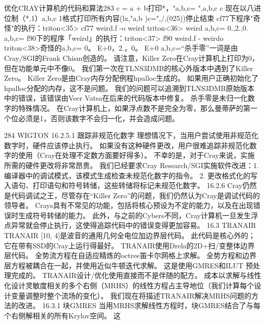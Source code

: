 \documentclass[UTF8,11pt,a4paper,openany,fontset=fandol]{ctexbook}
\begin{document}
优化CRAY计算机的代码和算法283 c = a + b打印*，"a,b,c= ",a,b,c c 现在以八进位制（*,1）a,b,c 1格式打印所有内容(lx,"a,b )c=",/,(025))停止结束 cf77下程序"奇怪"的执行：triton<35> cf77 weird.f -o weird triton<36> weird a,b,c= 0.,2.,0. a,b,c= f90下的程序「weird」的执行：triton<37> f90 weird.f - weirdo triton<38>奇怪的a,b,c= 0。 E+0，2.，0。 E+0 a,b,c=“杀手零”一词是由Cray/SGI的Frank Chism创造的。 请注意，Killer Zero在Cray计算机上打印为0，但在功能单元中不像0。 我们第一次在TLNS3DMB的核心外版本中遇到了Killer Zero。 Killer Zero是由Cray内存分配例程hpalloc生成的。 如果用户正确初始化了hpalloc分配的内存，这不是问题。 我们的问题可以追溯到TLNS3DMB原始版本中的错误，该错误由Veer Vatsa在后来的代码版本中修复。 杀手零是未归一化数字的特殊情况。 在Cray计算机上，如果浮点数不是完全为零，那么曼蒂萨的第一个位必须是1，否则该数字不会归一化，并会造成问题。

284 WIGTON 16.2.5.1 跟踪非规范化数字 理想情况下，当用户尝试使用非规范化数字时，硬件应该停止执行。 如果没有这种硬件更改，用户很难追踪非规范化数字的使用（Cray在处理不定数方面要好得多）。 不幸的是，对于Cray来说，实施所需的硬件更改将非常昂贵。 我们已经要求Cray Research/SGI实施软件改进：1. 编译器中的调试模式，该模式生成检查未规范化数字的指令。 2. 更改格式化的写入语句、打印语句和符号转储，这些转储将标记未规范化数字。 16.2.6 Cray仍然是代码调试之王，尽管存在“Killer Zero”的问题，我们仍然认为Cray是调试代码的领导者。 Crays具有不常见的功能，包括将核心预设为不定的能力，以及在出现错误时生成符号转储的能力。 此外，与之前的Cybers不同，Cray计算机一旦发生浮点异常就会停止执行，这使得追踪代码中的错误变得更加容易。 16.3 TRANAIR TRANAIR [10, 4]是波音的通用几何全电位加边界层代码。 此代码是核心外的；它在带有SSD的Cray上运行得最好。 TRANAIR使用Drela的2D+扫/变整体边界层代码。 全势流方程在自适应精炼的octree笛卡尔网格上求解。 全势方程和边界层方程被耦合在一起，并使用近似牛顿迭代求解。 这是使用GMRES和ILUT 预处理完成的。 TRANAIR设计/优化使用直接而不是伴随的配方。 成本以求解与线性化设计灵敏度相关的多个右侧（MRHS）的线性方程占主导地位（我们计算每个设计变量调整时整个流场的变化）。 我们现在将描述TRANAIR解决MRHS问题的方法的改进。 16.3.1 块GMRES 当用MRHS求解线性方程时，块GMRES结合了与每个右侧解相关的所有Krylov空间。 这
\end{document}
